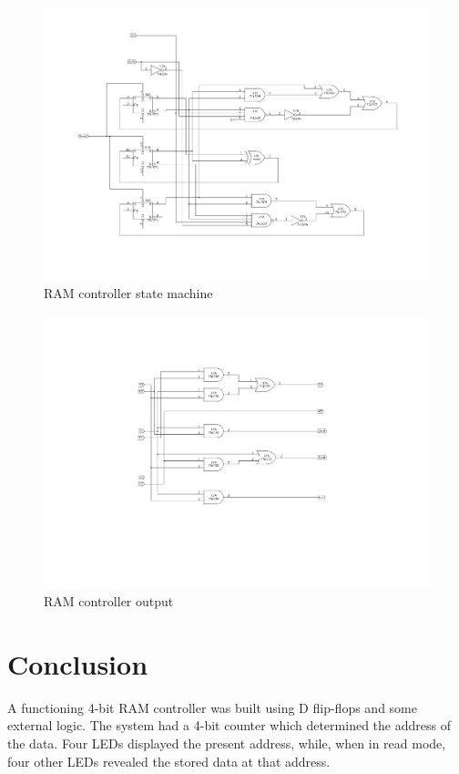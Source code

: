 \documentclass[11pt]{article}
\begin{document}
\begin{figure}[htpb]
	\centering
	\includegraphics[scale=0.5]{controller.pdf}
	\caption{RAM controller state machine}
	\label{fig:schematic-controller}
\end{figure}

\begin{figure}[htpb]
	\centering
	\includegraphics[scale=0.5]{output.pdf}
	\caption{RAM controller output}
	\label{fig:schematic-output}
\end{figure}

\section{Conclusion}

A functioning 4-bit RAM controller was built using D flip-flops and some external logic. The system had a 4-bit counter which determined the address of the data. Four LEDs displayed the present address, while, when in read mode, four other LEDs revealed the stored data at that address. 
\end{document}
